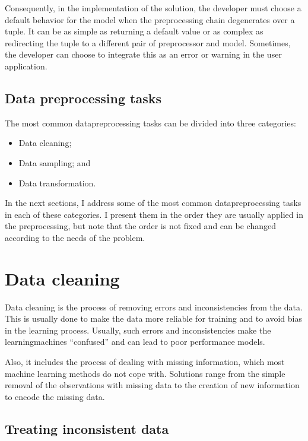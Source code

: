 Consequently, in the implementation of the solution, the developer must choose a default
behavior for the model when the preprocessing chain degenerates over a tuple.  It can
be as simple as returning a default value or as complex as redirecting the tuple to a
different pair of \gls{preprocessor} and model.  Sometimes, the developer can choose to
integrate this as an error or warning in the user application.

\subsection{Data preprocessing tasks}

The most common \gls{datapreprocessing} tasks can be divided into three categories:
\begin{itemize}
  \itemsep0em
  \item Data cleaning;
  \item Data sampling; and
  \item Data transformation.
\end{itemize}

In the next sections, I address some of the most common \gls{datapreprocessing} tasks
in each of these categories.  I present them in the order they are usually applied in the
preprocessing, but note that the order is not fixed and can be changed according to the
needs of the problem.

\section{Data cleaning}

Data cleaning is the process of removing errors and inconsistencies from the data.  This is
usually done to make the data more reliable for training and to avoid bias in the learning
process.  Usually, such errors and inconsistencies make the \glspl{learningmachine} ``confused''
and can lead to poor performance models.

Also, it includes the process of dealing with missing information, which most machine
learning methods do not cope with.  Solutions range from the simple removal of the
observations with missing data to the creation of new information to encode the missing data.

\subsection{Treating inconsistent data}


